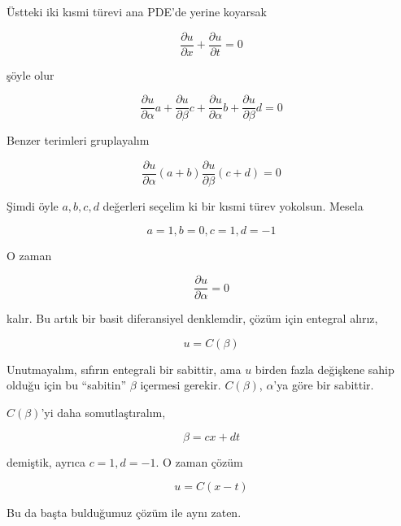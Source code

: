 \documentclass[12pt,fleqn]{article}\usepackage{../../common}
\begin{document}
Üstteki iki kısmi türevi ana PDE'de yerine koyarsak

$$ \frac{\partial u}{\partial x} + \frac{\partial u}{\partial t} = 0$$

şöyle olur

$$ 
\frac{\partial u}{\partial \alpha} a  +
\frac{\partial u}{\partial \beta} c + 
\frac{\partial u}{\partial \alpha} b + 
\frac{\partial u}{\partial \beta} d = 0
$$

Benzer terimleri gruplayalım

$$ 
\frac{\partial u}{\partial \alpha} (a+b)
\frac{\partial u}{\partial \beta} (c+d) = 0
$$

Şimdi öyle $a,b,c,d$ değerleri seçelim ki bir kısmi türev yokolsun. Mesela 

$$ a = 1, b = 0, c=1, d=-1 $$

O zaman 

$$ \frac{\partial u}{\partial \alpha} = 0 $$

kalır. Bu artık bir basit diferansiyel denklemdir, çözüm için entegral
alırız, 

$$ u = C(\beta) $$

Unutmayalım, sıfırın entegrali bir sabittir, ama $u$ birden fazla değişkene
sahip olduğu için bu ``sabitin'' $\beta$ içermesi gerekir. $C(\beta)$,
$\alpha$'ya göre bir sabittir. 

$C(\beta)$'yi daha somutlaştıralım, 

$$ \beta = cx + dt $$
 
demiştik, ayrıca $c=1,d=-1$. O zaman çözüm

$$ u = C(x-t) $$

Bu da başta bulduğumuz çözüm ile aynı zaten. 
\end{document}
